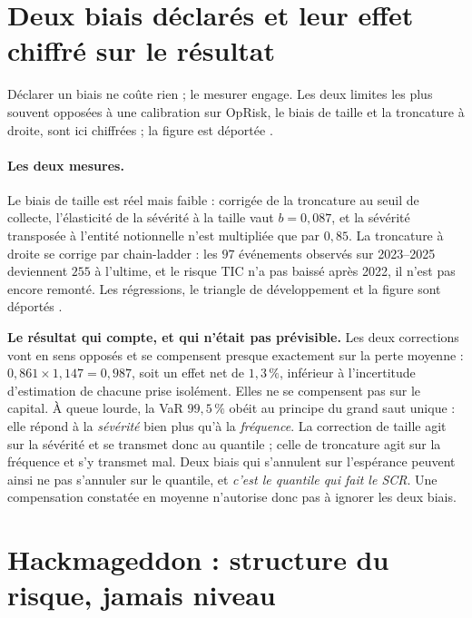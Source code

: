 \section{Deux biais déclarés et leur effet chiffré sur le résultat}
\label{sec:biais-chiffres}

Déclarer un biais ne coûte rien ; le mesurer engage. Les deux limites les plus souvent
opposées à une calibration sur OpRisk, le biais de taille et la troncature à droite, sont
ici chiffrées ; la figure est déportée \matcomp.

\paragraph{Les deux mesures.} Le biais de taille est réel mais faible : corrigée de la troncature
au seuil de collecte, l'élasticité de la sévérité à la taille vaut $b=0{,}087$, et la sévérité
transposée à l'entité notionnelle n'est multipliée que par $0{,}85$. La troncature à droite se
corrige par chain-ladder : les $97$ événements observés sur 2023--2025 deviennent $255$ à
l'ultime, et le risque TIC n'a pas baissé après 2022, il n'est pas encore remonté. Les
régressions, le triangle de développement et la figure sont déportés \matcomp.

\begin{cle}
\textbf{Le résultat qui compte, et qui n'était pas prévisible.} Les deux corrections vont en
sens opposés et se compensent presque exactement sur la perte moyenne :
$0{,}861\times1{,}147=0{,}987$, soit un effet net de $1{,}3\,\%$, inférieur à l'incertitude
d'estimation de chacune prise isolément. Elles ne se compensent pas sur le capital.
À queue lourde, la VaR $99{,}5\,\%$ obéit au principe du grand saut unique : elle répond à la
\emph{sévérité} bien plus qu'à la \emph{fréquence}. La correction de taille agit sur la
sévérité et se transmet donc au quantile ; celle de troncature agit sur la fréquence et s'y
transmet mal. Deux biais qui s'annulent sur l'espérance peuvent ainsi ne pas s'annuler sur le
quantile, et \emph{c'est le quantile qui fait le SCR}. Une compensation constatée en moyenne
n'autorise donc pas à ignorer les deux biais.
\end{cle}



\section{Hackmageddon : structure du risque, jamais niveau}
\label{sec:hackmageddon}


